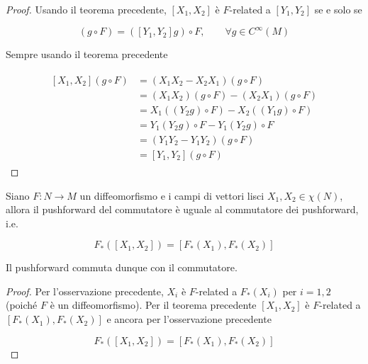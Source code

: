 \begin{proof}
	Usando il teorema precedente, $ [X_{1},X_{2}] $ è $ F $-related a $ [Y_{1},Y_{2}] $ se e solo se
	
	\begin{equation}
		[X_{1},X_{2}](g \circ F) = ([Y_{1},Y_{2}] g) \circ F, \qquad \forall g \in C^{\infty}(M)
	\end{equation}

	Sempre usando il teorema precedente
	
	\begin{align}
		\begin{split}
			[X_{1},X_{2}](g \circ F) &= (X_{1} X_{2} - X_{2} X_{1})(g \circ F)\\
			&= (X_{1} X_{2})(g \circ F) - (X_{2} X_{1})(g \circ F)\\
			&= X_{1}((Y_{2} g) \circ F) - X_{2}((Y_{1} g) \circ F)\\
			&= Y_{1}(Y_{2} g) \circ F - Y_{1}(Y_{2} g) \circ F\\
			&= (Y_{1} Y_{2} - Y_{1} Y_{2})(g \circ F)\\
			&= [Y_{1},Y_{2}](g \circ F)
		\end{split}
	\end{align}
\end{proof}

\begin{corollary}\label{frel-brack}
	Siano $ F : N \to M $ un diffeomorfismo e i campi di vettori lisci $ X_{1},X_{2} \in \chi(N) $, allora il pushforward del commutatore è uguale al commutatore dei pushforward, i.e.
	
	\begin{equation}
		F_{*} ([X_{1},X_{2}]) = [F_{*} (X_{1}),F_{*} (X_{2})]
	\end{equation}

	Il pushforward commuta dunque con il commutatore.
\end{corollary}

\begin{proof}
	Per l'osservazione precedente, $ X_{i} $ è $ F $-related a $ F_{*}(X_{i}) $ per $ i=1,2 $ (poiché $ F $ è un diffeomorfismo). Per il teorema precedente $ [X_{1},X_{2}] $ è $ F $-related a $ [F_{*} (X_{1}),F_{*} (X_{2})] $ e ancora per l'osservazione precedente
	
	\begin{equation}
		F_{*} ([X_{1},X_{2}]) = [F_{*} (X_{1}),F_{*} (X_{2})]
	\end{equation}
\end{proof}


























